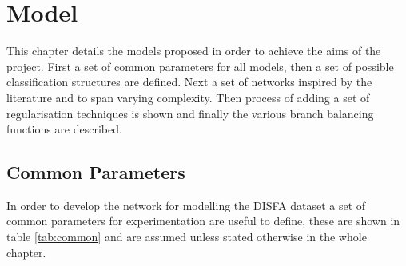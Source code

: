 \chapter{Model} \label{sec:model}

  This chapter details the models proposed in order to achieve the aims of the project.
  First a set of common parameters for all models, then a set of possible
  classification structures are defined. Next a set of networks inspired
  by the literature and to span varying complexity.
  Then process of adding a set of regularisation techniques is shown and finally the
  various branch balancing functions are described.

  \section{Common Parameters}
    In order to develop the network for modelling the DISFA dataset a set of common
    parameters for experimentation are useful to define, these are shown in table \ref{tab:common}
    and are assumed unless stated otherwise in the whole chapter.


